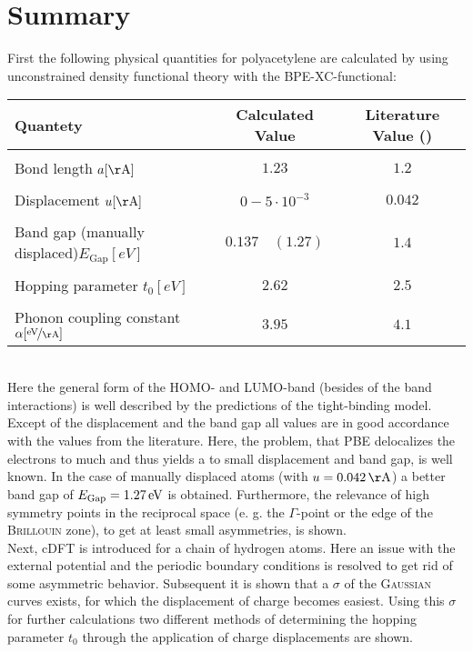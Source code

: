 \chapter{Summary}
First the following physical quantities for polyacetylene are calculated by using unconstrained density functional theory with the BPE-XC-functional:
\begin{table}[!h]
	\centering
	\begin{tabular}{l|c|c}
		Quantety & Calculated Value & Literature Value (\cite{PhysRevLett.42.1698, doi:10.1021/cr990357p})\\
		\hline \hline
		&&\\[-.3cm]
		Bond length \hfill$a [\unit{\AA}]$ & $1.23$ & $1.2$\\ \hline&&\\[-.3cm]
		Displacement \hfill$u [\unit{\AA}]$& $0 - 5\cdot10^{-3}$ & $0.042$\\ \hline&&\\[-.3cm]
		Band gap (manually displaced)\hfill$E_\text{Gap} [\unit{eV}]$ & $0.137\quad(1.27)$ & $1.4$\\ \hline &&\\[-.3cm]
		Hopping parameter \hfill$t_0 [\unit{eV}]$ & $2.62$ & $2.5$ \\ \hline&&\\[-.3cm]
		Phonon coupling constant \hspace*{2cm}$\alpha [\unitfrac{eV}{\AA}]$& $3.95$ & $4.1$
	\end{tabular}
\end{table}\\
Here the general form of the HOMO- and LUMO-band (besides of the band interactions) is well described by the predictions of the tight-binding model. Except of the displacement and the band gap all values are in good accordance with the values from the literature. Here, the problem, that PBE delocalizes the electrons to much and thus yields a to small displacement and band gap, is well known. In the case of manually displaced atoms (with $u = \unit[0.042]{\AA}$) a better band gap of $E_\text{Gap} = \unit[1.27]{eV}$ is obtained. Furthermore, the relevance of high symmetry points in the reciprocal space (e. g. the $\Gamma$-point or the edge of the \textsc{Brillouin} zone), to get at least small asymmetries, is shown.\\
Next, cDFT is introduced for a chain of hydrogen atoms. Here an issue with the external potential and the periodic boundary conditions is resolved to get rid of some asymmetric behavior. Subsequent it is shown that a $\sigma$ of the \textsc{Gaussian} curves exists, for which the displacement of charge becomes easiest. Using this $\sigma$ for further calculations two different methods of determining the hopping parameter $t_0$ through the application of charge displacements are shown.\\
